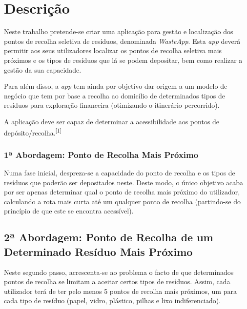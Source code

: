 \documentclass[article, a4paper, 12pt, oneside]{memoir}
\begin{document}
\chapter[Descrição][Descrição]{Descrição} \label{\thechapter}

Neste trabalho pretende-se criar uma aplicação para gestão e localização dos pontos de recolha seletiva de resíduos, denominada \textit{WasteApp}. Esta \textit{app} deverá permitir aos seus utilizadores localizar os pontos de recolha seletiva mais próximos e os tipos de resíduos que lá se podem depositar, bem como realizar a gestão da sua capacidade.

Para além disso, a \textit{app} tem ainda por objetivo dar origem a um modelo de negócio que tem por base a recolha ao domicílio de determinados tipos de resíduos para exploração financeira (otimizando o itinerário percorrido).

A aplicação deve ser capaz de determinar a acessibilidade aos pontos de depósito/recolha.\textsuperscript{[1]}

\subsection[1ª Abordagem: Ponto de Recolha Mais Próximo][1ª Abordagem: Ponto de Recolha Mais Próximo]{1ª Abordagem: Ponto de Recolha Mais Próximo} \label{\thesection}
	
	Numa fase inicial, despreza-se a capacidade do ponto de recolha e os tipos de resíduos que poderão ser depositados neste. Deste modo, o único objetivo acaba por ser apenas determinar qual o ponto de recolha mais próximo do utilizador, calculando a rota mais curta até um qualquer ponto de recolha (partindo-se do princípio de que este se encontra acessível).

\section[2ª Abordagem: Ponto de Recolha de um Determinado Resíduo Mais Próximo][2ª Abordagem: Ponto de Recolha de um Determinado Resíduo Mais Próximo]{2ª Abordagem: Ponto de Recolha de um Determinado Resíduo Mais Próximo} \label{\thesection}
	
	Neste segundo passo, acrescenta-se ao problema o facto de que determinados pontos de recolha se limitam a aceitar certos tipos de resíduos. Assim, cada utilizador terá de ter pelo menos 5 pontos de recolha mais próximos, um para cada tipo de resíduo (papel, vidro, plástico, pilhas e lixo indiferenciado).	
\end{document}
